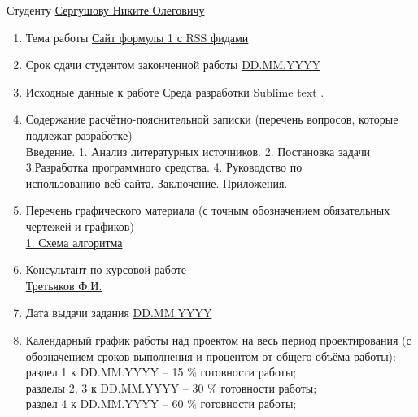\documentclass[14pt,a4paper]{extreport}
\begin{document}
	\endcenter
	\raggedright
	Студенту \underline{ Сергушову Никите Олеговичу }\\
	\begin{enumerate}
	\item Тема работы \underline{Сайт формулы 1 с RSS фидами}\\ 
	\item Срок сдачи студентом законченной работы \underline{DD.MM.YYYY}
	\item Исходные данные к работе \underline{Среда разработки Sublime text . }
	\item Содержание расчётно-пояснительной записки (перечень вопросов, которые подлежат разработке)\\
	\underline{\hspace*{16cm}}\hspace*{-16cm}Введение. 1. Анализ литературных источников. 2. Постановка задачи\\
	\underline{\hspace*{16cm}}\hspace*{-16cm}3.Разработка программного средства. 4. Руководство по \\
	\underline{\hspace*{16cm}}\hspace*{-16cm}использованию веб-сайта. Заключение. Приложения.
	\item Перечень графического материала (с точным обозначением обязательных чертежей и графиков)\\
	\underline{1. Схема алгоритма}
	\item Консультант по курсовой работе\\
	\underline{Третьяков Ф.И.}  
	\item Дата выдачи задания \underline{DD.MM.YYYY}
	\item Календарный график работы над проектом на весь период проектирования (с обозначением сроков выполнения и процентом от общего объёма работы):\\
	\underline{\hspace*{16cm}}\hspace*{-16cm}раздел 1 к DD.MM.YYYY – 15 \% готовности работы;\\  
	\underline{\hspace*{16cm}}\hspace*{-16cm}разделы 2, 3 к DD.MM.YYYY – 30 \% готовности работы;\\ 
	\underline{\hspace*{16cm}}\hspace*{-16cm}раздел 4 к DD.MM.YYYY – 60 \% готовности работы;\\

\end{enumerate}
\end{document}
